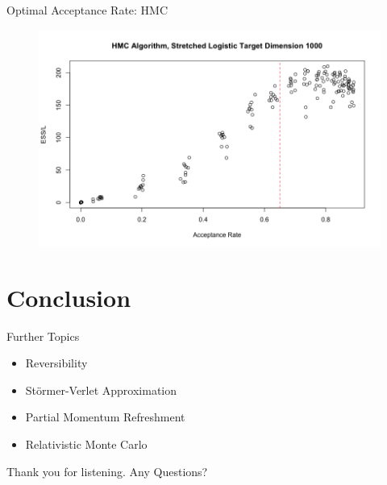\documentclass{beamer}
\begin{document}
\begin{frame}{Optimal Acceptance Rate: HMC}
\begin{figure}
\centering
\includegraphics[scale = 0.3]{HMC_Optimal1000.png}
\end{figure}
\end{frame}


\section{Conclusion}



\begin{frame}{Further Topics}

\begin{itemize}

\item Reversibility 

\item Störmer-Verlet Approximation 

\item Partial Momentum Refreshment

\item Relativistic Monte Carlo

\end{itemize}

\begin{center}
Thank you for listening.
\vskip 0.5cm
Any Questions?

\end{center}


\end{frame}
\end{document}
